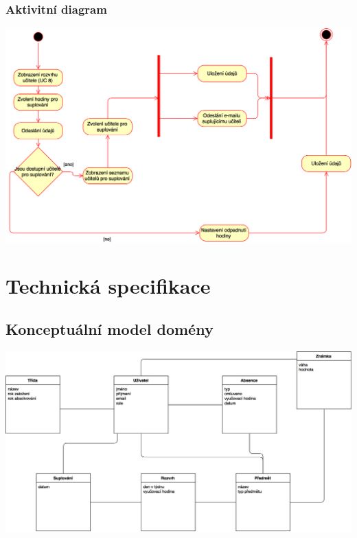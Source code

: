 \documentclass[a4paper,10pt,titlepage]{article}
\begin{document}
	\subsubsection*{Aktivitní diagram}
	\includegraphics[width=\textwidth]{vis_uc9_activity}
	\vspace{5mm}
	
	\section{Technická specifikace}
	\subsection{Konceptuální model domény}
			\includegraphics[width=\textwidth]{vis_conceptual_domain_model}
\end{document}
